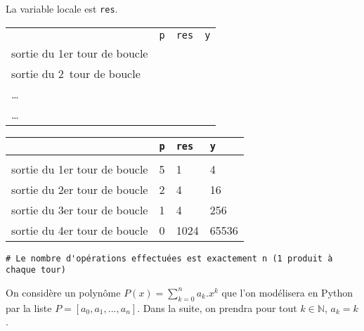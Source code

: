 \ifprof
\begin{corrige}
La variable locale est \texttt{res}.
\end{corrige}
\else
\fi	
\ifprof
\else	
	\begin{center}
		\begin{tabular}{|l|p{1cm}|p{1cm}|p{1cm}|}
			\hline & \texttt{p} & \texttt{res} & \texttt{y}\\
			sortie du 1{\textrm{er}} tour de boucle && & \\[3mm]
			sortie du 2\ieme\  tour de boucle && & \\[3mm]
			\ldots && & \\[3mm]
			\ldots&& & \\[3mm]
		\end{tabular}
	\end{center}
\fi

\ifprof
\begin{corrige}
\begin{center}
\begin{tabular}{|l|p{1cm}|p{1cm}|p{1cm}|}
\hline & \texttt{p} & \texttt{res} & \texttt{y}\\
\hline &&&\\
sortie du 1{\textrm{er}} tour de boucle & 5 & 1 & 4\\
sortie du 2{\textrm{er}} tour de boucle & 2 & 4 & 16\\
sortie du 3{\textrm{er}} tour de boucle & 1 & 4 & 256\\
sortie du 4{\textrm{er}} tour de boucle & 0 & 1024 & 65536\\
\end{tabular}
\end{center}
\begin{lstlisting}
# Le nombre d'opérations effectuées est exactement n (1 produit à chaque tour)
\end{lstlisting}
\end{corrige}
\else
\fi	
	


On considère un polynôme $P(x)=\sum_{k=0}^n a_k.x^k$ que l'on modélisera en Python par la liste $P=[a_0,a_1,...,a_n]$. Dans la suite, on prendra pour tout $k\in\mathbb{N}$, $a_k=k$.


